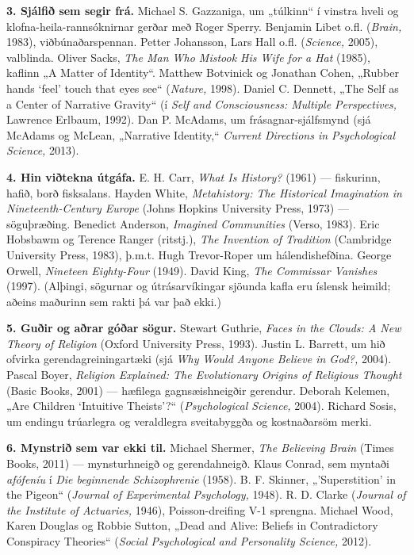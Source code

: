 \textbf{3. Sjálfið sem segir frá.} Michael S. Gazzaniga, um „túlkinn“ í vinstra hveli og klofna-heila-rannsóknirnar gerðar með Roger Sperry. Benjamin Libet o.fl. (\emph{Brain,} 1983), viðbúnaðarspennan. Petter Johansson, Lars Hall o.fl. (\emph{Science,} 2005), valblinda. Oliver Sacks, \emph{The Man Who Mistook His Wife for a Hat} (1985), kaflinn „A Matter of Identity“. Matthew Botvinick og Jonathan Cohen, „Rubber hands ‘feel’ touch that eyes see“ (\emph{Nature,} 1998). Daniel C. Dennett, „The Self as a Center of Narrative Gravity“ (í \emph{Self and Consciousness: Multiple Perspectives,} Lawrence Erlbaum, 1992). Dan P. McAdams, um frásagnar-sjálfsmynd (sjá McAdams og McLean, „Narrative Identity,“ \emph{Current Directions in Psychological Science,} 2013).

\textbf{4. Hin viðtekna útgáfa.} E. H. Carr, \emph{What Is History?} (1961) — fiskurinn, hafið, borð fisksalans. Hayden White, \emph{Metahistory: The Historical Imagination in Nineteenth-Century Europe} (Johns Hopkins University Press, 1973) — söguþræðing. Benedict Anderson, \emph{Imagined Communities} (Verso, 1983). Eric Hobsbawm og Terence Ranger (ritstj.), \emph{The Invention of Tradition} (Cambridge University Press, 1983), þ.m.t. Hugh Trevor-Roper um hálendishefðina. George Orwell, \emph{Nineteen Eighty-Four} (1949). David King, \emph{The Commissar Vanishes} (1997). (Alþingi, sögurnar og útrásarvíkingar sjöunda kafla eru íslensk heimild; aðeins maðurinn sem rakti þá var það ekki.)

\textbf{5. Guðir og aðrar góðar sögur.} Stewart Guthrie, \emph{Faces in the Clouds: A New Theory of Religion} (Oxford University Press, 1993). Justin L. Barrett, um hið ofvirka gerendagreiningartæki (sjá \emph{Why Would Anyone Believe in God?,} 2004). Pascal Boyer, \emph{Religion Explained: The Evolutionary Origins of Religious Thought} (Basic Books, 2001) — hæfilega gagnsæishneigðir gerendur. Deborah Kelemen, „Are Children ‘Intuitive Theists’?“ (\emph{Psychological Science,} 2004). Richard Sosis, um endingu trúarlegra og veraldlegra sveitabyggða og kostnaðarsöm merki.

\textbf{6. Mynstrið sem var ekki til.} Michael Shermer, \emph{The Believing Brain} (Times Books, 2011) — mynsturhneigð og gerendahneigð. Klaus Conrad, sem myntaði \emph{afófeníu} í \emph{Die beginnende Schizophrenie} (1958). B. F. Skinner, „'Superstition' in the Pigeon“ (\emph{Journal of Experimental Psychology,} 1948). R. D. Clarke (\emph{Journal of the Institute of Actuaries,} 1946), Poisson-dreifing V-1 sprengna. Michael Wood, Karen Douglas og Robbie Sutton, „Dead and Alive: Beliefs in Contradictory Conspiracy Theories“ (\emph{Social Psychological and Personality Science,} 2012).

